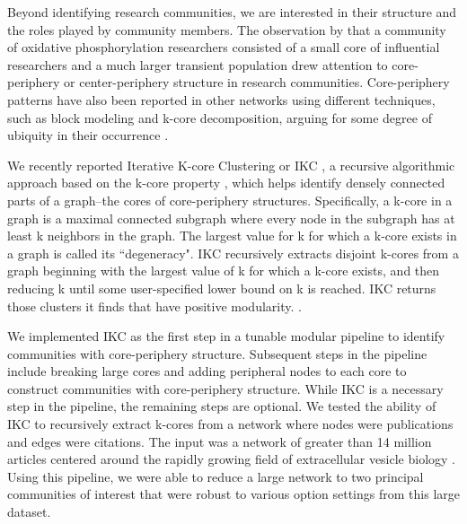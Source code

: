 \documentclass[12pt, oneside]{article}   	%
\begin{document}
Beyond identifying research communities, we are interested in their structure and the roles played by community members.  The observation by \cite{Price1966} that a community of oxidative phosphorylation researchers consisted of a small core of influential researchers and a much larger transient population drew attention to core-periphery or center-periphery structure in research communities. Core-periphery patterns have also been reported in other networks using different techniques, such as block modeling and k-core decomposition, arguing for some degree of ubiquity in their occurrence \citep{borgatti2000models,Breiger2014,Zhang2015,Rombach2017,gallagher2021clarified,yanchenko_2202.04455}. 	

We recently reported Iterative K-core Clustering or IKC \citep{Wedell2022}, a recursive algorithmic approach based on the k-core property \citep{Giatsidis2011,malliaros2019}, which helps identify densely connected parts of a graph--the cores of core-periphery structures. Specifically, a k-core in a graph is a maximal connected subgraph where every node in the subgraph has at least k neighbors in the graph.
The largest value for k for which a k-core exists in a graph is called its ``degeneracy". IKC recursively extracts disjoint k-cores from a graph beginning with the largest value of k for which a  k-core  exists, and then reducing k until some user-specified lower bound on k is reached. IKC returns those clusters it finds that have positive modularity.  .

We implemented IKC as the first step in a tunable modular pipeline to identify communities with core-periphery structure. 
Subsequent steps in the pipeline include breaking large cores and adding peripheral nodes to each core to construct communities with core-periphery structure. While IKC is a necessary step in the pipeline, the remaining steps are optional. We tested the ability of IKC to recursively extract k-cores from a network where nodes were publications and edges were citations. 
The input was a network of greater than 14 million articles centered around the rapidly growing field of extracellular vesicle biology \citep{Wedell2022}. Using this pipeline, we were able to reduce a large network to two principal communities of interest that were robust to various option settings \citep[Figure 5]{Wedell2022} from this large dataset.
	
\end{document}
